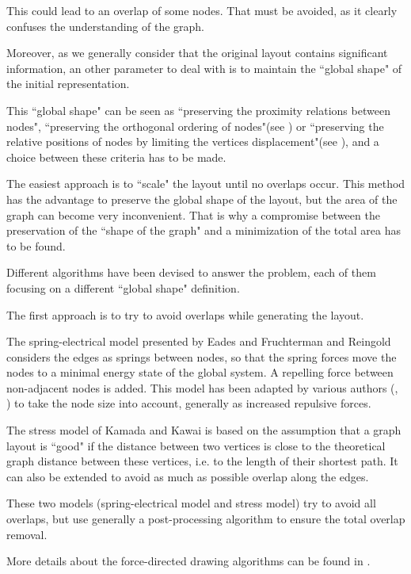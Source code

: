 \documentclass[12pt]{report}
\begin{document}
This could lead to an overlap of some nodes. That must be avoided, as it clearly confuses the understanding of the graph.

Moreover, as we generally consider that the original layout contains significant information, an other parameter to deal with is to maintain the ``global shape" of the initial representation. 

This ``global shape" can be seen as ``preserving the proximity relations between nodes", ``preserving the orthogonal ordering of nodes"(see \cite{Mis95}) or ``preserving the relative positions of nodes by limiting the vertices displacement"(see \cite{Gansner98}), and a choice between these criteria has to be made.

The easiest approach is to ``scale" the layout until no overlaps occur. This method has the advantage to preserve the global shape of the layout, but the area of the graph can become very inconvenient. That is why a compromise between the preservation of the ``shape of the graph" and a minimization of the total area has to be found.

Different algorithms have been devised to answer the problem, each of them focusing on a different ``global shape" definition. 

\bigskip
The first approach is to try to avoid overlaps while generating the layout.

The spring-electrical model presented by Eades \cite{Eades84} and Fruchterman and Reingold \cite{FR91} considers the edges as springs between nodes, so that the spring forces move the nodes to a minimal energy state of the global system. A repelling force between non-adjacent nodes is added.
This model has been adapted by various authors (\cite{HK02}, \cite{Li05}) to take the node size into account, generally as increased repulsive forces.

The stress model of Kamada and Kawai \cite{Kamada89} is based on the assumption that a graph layout is ``good" if the distance between two vertices is close to the theoretical graph distance between these vertices, i.e. to the length of their shortest path. It can also be extended to avoid as much as possible overlap along the edges.

These two models (spring-electrical model and stress model) try to avoid all overlaps, but use generally a post-processing algorithm to ensure the total overlap removal.

More details about the force-directed drawing algorithms can be found in \cite{Kob13}.
\end{document}
